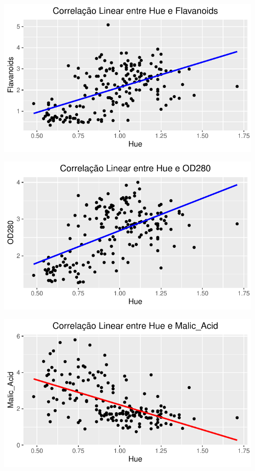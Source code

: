 \documentclass[
  letterpaper,
  DIV=11,
  numbers=noendperiod]{scrartcl}
\begin{document}
\begin{center}
\includegraphics{wines_analysis_files/figure-pdf/unnamed-chunk-15-1.pdf}
\end{center}

\begin{center}
\includegraphics{wines_analysis_files/figure-pdf/unnamed-chunk-15-2.pdf}
\end{center}

\begin{center}
\includegraphics{wines_analysis_files/figure-pdf/unnamed-chunk-15-3.pdf}
\end{center}
\end{document}
